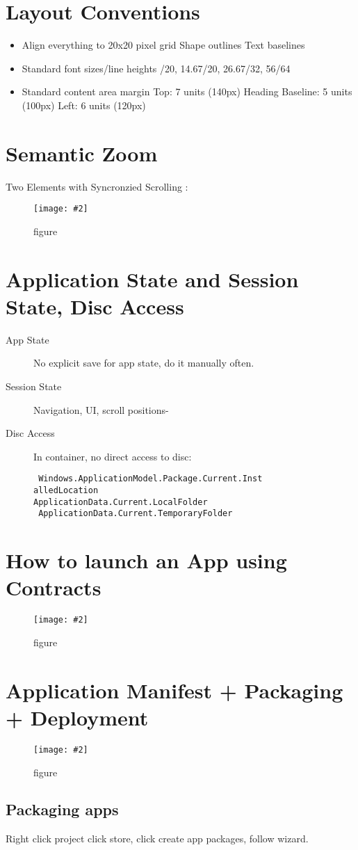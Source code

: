 \documentclass[a4paper,10pt]{scrreprt}
\newcommand{\pic}[2][figure]{\begin{figure}[h]
 \centering
 \texttt{[image: \#2]}
 \caption{#1}
\end{figure}
}
\begin{document}
\section{Layout Conventions}
\begin{itemize}
\item Align everything to 20x20 pixel grid
\subitem Shape outlines
\subitem Text baselines
\item Standard font sizes/line heights
/20, 14.67/20, 26.67/32, 56/64
\item Standard content area margin
\subitem Top: 7 units (140px)
\subitem Heading Baseline: 5 units (100px)
\subitem Left: 6 units (120px)
\end{itemize}

\section{Semantic Zoom}
Two Elements with Syncronzied Scrolling :
\pic{semz.png}

\section{Application State and Session State, Disc Access}
\begin{description}
 \item [App State] No explicit save for app state, do it manually often.
 \item [Session State] Navigation, UI, scroll positions-
\item[Disc Access] In container, no direct access to disc:\\
\begin{verbatim}
 Windows.ApplicationModel.Package.Current.Inst
alledLocation
ApplicationData.Current.LocalFolder
 ApplicationData.Current.TemporaryFolder

\end{verbatim}
\end{description}

\section{How to launch an App using Contracts}
\pic{lac.png}

\section{Application Manifest + Packaging + Deployment}
\pic{am.png}
\subsection{Packaging apps}
Right click project click store, click create app packages, follow wizard.
\end{document}
